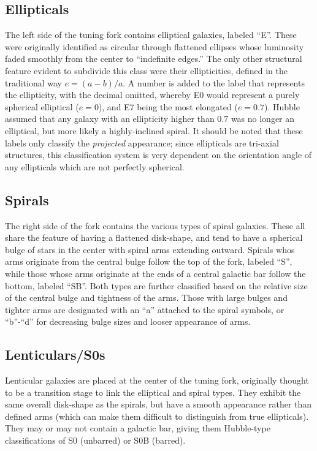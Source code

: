 \subsection{Ellipticals}

The left side of the tuning fork contains elliptical galaxies, labeled ``E''. These were originally identified as circular through flattened ellipses whose luminosity faded smoothly from the center to ``indefinite edges.'' The only other structural feature evident to subdivide this class were their ellipticities, defined in the traditional way $e=(a-b)/a$. A number is added to the label that represents the ellipticity, with the decimal omitted, whereby E0 would represent a purely spherical elliptical ($e=0$), and E7 being the most elongated ($e=0.7$). Hubble assumed that any galaxy with an ellipticity higher than 0.7 was no longer an elliptical, but more likely a highly-inclined spiral. It should be noted that these labels only classify the \emph{projected} appearance; since ellipticals are tri-axial structures, this classification system is very dependent on the orientation angle of any ellipticals which are not perfectly spherical.  

\subsection{Spirals}

The right side of the fork contains the various types of spiral galaxies. These all share the feature of having a flattened disk-shape, and tend to have a spherical bulge of stars in the center with spiral arms extending outward. Spirals whos arms originate from the central bulge follow the top of the fork, labeled ``S'', while those whose arms originate at the ends of a central galactic bar follow the bottom, labeled ``SB''. Both types are further classified based on the relative size of the central bulge and tightness of the arms. Those with large bulges and tighter arms are designated with an ``a'' attached to the spiral symbols, or ``b''-``d'' for decreasing bulge sizes and looser appearance of arms. 

\subsection{Lenticulars/S0s}

Lenticular galaxies are placed at the center of the tuning fork, originally thought to be a transition stage to link the elliptical and spiral types. They exhibit the same overall disk-shape as the spirals, but have a smooth appearance rather than defined arms (which can make them difficult to distinguish from true ellipticals). They may or may not contain a galactic bar, giving them Hubble-type classifications of S0 (unbarred) or S0B (barred). 


